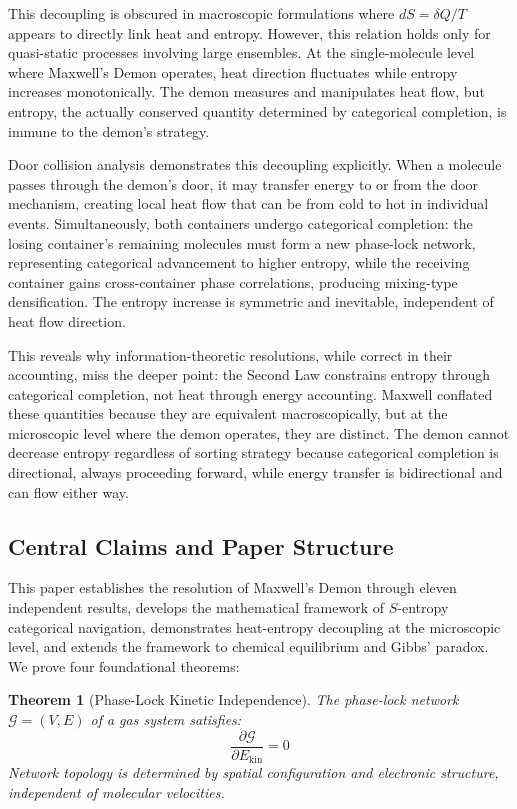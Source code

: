 \documentclass[12pt,a4paper]{article}
\newtheorem{theorem}{Theorem}[section]
\theoremstyle{definition}
\theoremstyle{remark}
\newcommand{\phaselockgraph}{\mathcal{G}}
\begin{document}
This decoupling is obscured in macroscopic formulations where $dS = \delta Q/T$ appears to directly link heat and entropy. However, this relation holds only for quasi-static processes involving large ensembles. At the single-molecule level where Maxwell's Demon operates, heat direction fluctuates while entropy increases monotonically. The demon measures and manipulates heat flow, but entropy, the actually conserved quantity determined by categorical completion, is immune to the demon's strategy.

Door collision analysis demonstrates this decoupling explicitly. When a molecule passes through the demon's door, it may transfer energy to or from the door mechanism, creating local heat flow that can be from cold to hot in individual events. Simultaneously, both containers undergo categorical completion: the losing container's remaining molecules must form a new phase-lock network, representing categorical advancement to higher entropy, while the receiving container gains cross-container phase correlations, producing mixing-type densification. The entropy increase is symmetric and inevitable, independent of heat flow direction.

This reveals why information-theoretic resolutions, while correct in their accounting, miss the deeper point: the Second Law constrains entropy through categorical completion, not heat through energy accounting. Maxwell conflated these quantities because they are equivalent macroscopically, but at the microscopic level where the demon operates, they are distinct. The demon cannot decrease entropy regardless of sorting strategy because categorical completion is directional, always proceeding forward, while energy transfer is bidirectional and can flow either way.

\subsection{Central Claims and Paper Structure}

This paper establishes the resolution of Maxwell's Demon through eleven independent results, develops the mathematical framework of $S$-entropy categorical navigation, demonstrates heat-entropy decoupling at the microscopic level, and extends the framework to chemical equilibrium and Gibbs' paradox. We prove four foundational theorems:

\begin{theorem}[Phase-Lock Kinetic Independence]
\label{thm:kinetic_independence_intro}
The phase-lock network $\phaselockgraph = (V, E)$ of a gas system satisfies:
\begin{equation}
\frac{\partial \phaselockgraph}{\partial E_{\text{kin}}} = 0
\end{equation}
Network topology is determined by spatial configuration and electronic structure, independent of molecular velocities.
\end{theorem}
\end{document}
